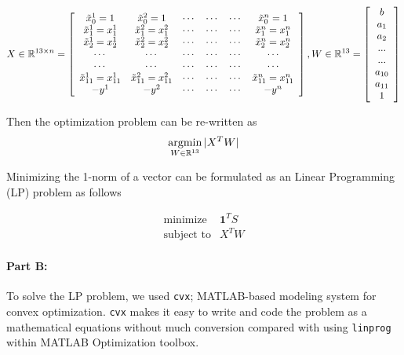 \[
X\in \mathbb{R}^{13 \times n} = 
\left[
\begin{array}{cc ccc c}
\tilde{x}_{0}^{1} =1 &  \tilde{x}_{0}^{2} =1 & \cdots & \cdots & \cdots &  \tilde{x}_{0}^{n} =1\\
\tilde{x}_{1}^{1} = x_{1}^{1} & \tilde{x}_{1}^{2} = x_{1}^{2} & \cdots & \cdots & \cdots & \tilde{x}_{1}^{n} = x_{1}^{n}\\
\tilde{x}_{2}^{1} = x_{2}^{1} & \tilde{x}_{2}^{2} = x_{2}^{2} & \cdots & \cdots & \cdots & \tilde{x}_{2}^{n} = x_{2}^{n}\\
\cdots & \cdots & \cdots & \cdots & \cdots & \cdots\\
\cdots & \cdots & \cdots & \cdots & \cdots & \cdots\\
\tilde{x}_{11}^{1} = x_{11}^{1} & \tilde{x}_{11}^{2} = x_{11}^{2} & \cdots & \cdots & \cdots & \tilde{x}_{11}^{n} = x_{11}^{n}\\
-y^{1} & -y^{2} & \cdots & \cdots & \cdots & -y^{n}\\
\end{array} 
\right],
W \in \mathbb{R}^{13} =
\left[
\begin{array}{c}
b \\
a_{1} \\
a_{2} \\
...\\
...\\
a_{10} \\
a_{11} \\
1
\end{array} 
\right]
\]

Then the optimization problem can be re-written as 
\[
\operatorname*{argmin}_{W\in \mathbb{R}^{13}} |X^{T}W|
\]

Minimizing the 1-norm of a vector can be formulated as an Linear Programming (LP) problem as follows

\[
\begin{array}{cl}
\text{minimize} &  \mathbf{1}^{T}S\\
\text{subject to} & X^{T}W 
\end{array} 
\]

\paragraph{Part B:}
To solve the LP problem, we used \texttt{cvx}; MATLAB-based modeling system for convex optimization. \texttt{cvx} makes it easy to write and code the problem as a mathematical equations without much conversion compared with using \texttt{linprog} within MATLAB Optimization toolbox. 

